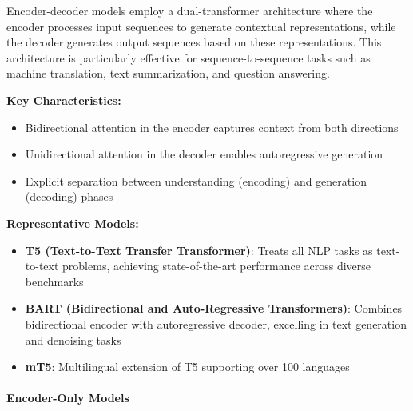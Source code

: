 \documentclass[12pt,a4paper]{article}
\begin{document}
Encoder-decoder models employ a dual-transformer architecture where the encoder processes input sequences to generate contextual representations, while the decoder generates output sequences based on these representations. This architecture is particularly effective for sequence-to-sequence tasks such as machine translation, text summarization, and question answering.

\textbf{Key Characteristics:}
\begin{itemize}
    \item Bidirectional attention in the encoder captures context from both directions
    \item Unidirectional attention in the decoder enables autoregressive generation
    \item Explicit separation between understanding (encoding) and generation (decoding) phases
\end{itemize}

\textbf{Representative Models:}
\begin{itemize}
    \item \textbf{T5 (Text-to-Text Transfer Transformer)}: Treats all NLP tasks as text-to-text problems, achieving state-of-the-art performance across diverse benchmarks
    \item \textbf{BART (Bidirectional and Auto-Regressive Transformers)}: Combines bidirectional encoder with autoregressive decoder, excelling in text generation and denoising tasks
    \item \textbf{mT5}: Multilingual extension of T5 supporting over 100 languages
\end{itemize}

\paragraph{Encoder-Only Models}

\end{document}
